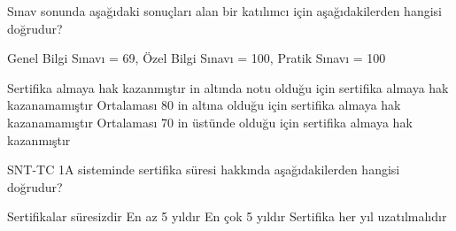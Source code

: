 \begin{question}[subtitle=]
	Sınav sonunda aşağıdaki sonuçları alan bir katılımcı için aşağıdakilerden hangisi doğrudur?\par
	Genel Bilgi Sınavı = 69,    Özel Bilgi Sınavı = 100,  Pratik Sınavı = 100 
		
	\begin{tasks}
		\task Sertifika almaya hak kazanmıştır
		 in altında notu olduğu için sertifika almaya hak kazanamamıştır \correct
		\task Ortalaması 80 in altına olduğu için sertifika almaya hak kazanamamıştır
		\task Ortalaması 70 in üstünde olduğu için sertifika almaya hak kazanmıştır

	\end{tasks}
\end{question}
\begin{solution}
	\correct
\end{solution}


\begin{question}[subtitle=]
	SNT-TC 1A  sisteminde sertifika süresi hakkında aşağıdakilerden hangisi doğrudur? 
	
	\begin{tasks}
		\task Sertifikalar süresizdir
		\task En az 5 yıldır
		\task En çok 5 yıldır \correct
		\task Sertifika her yıl uzatılmalıdır

	\end{tasks}
\end{question}
\begin{solution}
	\correct
\end{solution}